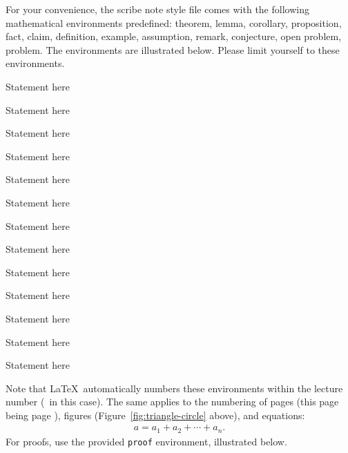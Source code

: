 \documentclass[usletter]{article}
\begin{document}
\begin{corollary}
For your convenience, the scribe note style file comes
with the following mathematical environments
predefined: theorem, lemma, corollary, proposition,
fact, claim, definition, example, assumption, remark,
conjecture, open problem, problem. The environments are
illustrated below.  Please limit yourself to these
environments.

\begin{theorem}
Statement here 
\end{theorem}

\begin{lemma}
Statement here
\end{lemma}

\begin{corollary}
Statement here
\end{corollary}

\begin{proposition}
Statement here
\end{proposition}

\begin{fact}
Statement here
\end{fact}

\begin{claim}
Statement here
\end{claim}

\begin{definition}
Statement here
\end{definition}

\begin{example}
Statement here
\end{example}

\begin{assumption}
Statement here
\end{assumption}

\begin{remark}
Statement here
\end{remark}

\begin{conjecture}
Statement here
\end{conjecture}

\begin{openproblem}
Statement here
\end{openproblem}

\begin{problem}
Statement here
\end{problem}


\noindent
Note that \LaTeX\ automatically numbers these
environments within the lecture number (\thelecture\ in
this case).  The same applies to the numbering of pages
(this page being page \thepage), figures
(Figure~\ref{fig:triangle-circle} above), and
equations:
\begin{align}
a = a_1+a_2+\cdots+a_n.
\end{align}
\noindent
For proofs, use the provided {\tt proof} environment,
illustrated below.


\end{corollary}
\end{document}
